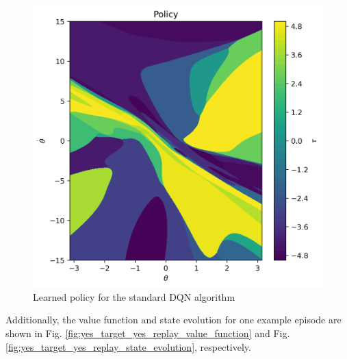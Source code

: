 \documentclass[conference]{IEEEtran}
\begin{document}
\begin{figure}[h]
\centering
\includegraphics[width=0.949\linewidth]{../figures/yes_target_yes_replay/ctr_policy_150_1000.png}
\caption{Learned policy for the standard DQN algorithm}
\label{fig:yes_target_yes_replay_policy}
\end{figure}
Additionally, the value function and state evolution for one example episode are shown in Fig. \ref{fig:yes_target_yes_replay_value_function} and Fig. \ref{fig:yes_target_yes_replay_state_evolution}, respectively.
\end{document}
